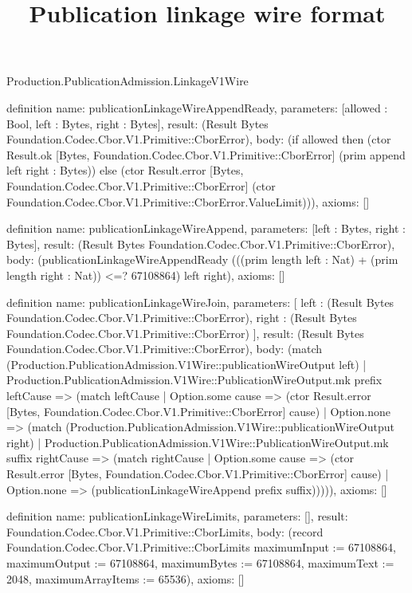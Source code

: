 \begin{lexlean}{Production.PublicationAdmission.LinkageV1Wire}
\title{Publication linkage wire format}
\begin{semanticmodule}
definition{
  name: publicationLinkageWireAppendReady,
  parameters: [allowed : Bool, left : Bytes, right : Bytes],
  result: (Result Bytes Foundation.Codec.Cbor.V1.Primitive::CborError),
  body: (if allowed then (ctor Result.ok [Bytes, Foundation.Codec.Cbor.V1.Primitive::CborError] (prim append left right : Bytes)) else (ctor Result.error [Bytes, Foundation.Codec.Cbor.V1.Primitive::CborError] (ctor Foundation.Codec.Cbor.V1.Primitive::CborError.ValueLimit))),
  axioms: []
}

definition{
  name: publicationLinkageWireAppend,
  parameters: [left : Bytes, right : Bytes],
  result: (Result Bytes Foundation.Codec.Cbor.V1.Primitive::CborError),
  body: (publicationLinkageWireAppendReady (((prim length left : Nat) + (prim length right : Nat)) <=? 67108864) left right),
  axioms: []
}

definition{
  name: publicationLinkageWireJoin,
  parameters: [
    left : (Result Bytes Foundation.Codec.Cbor.V1.Primitive::CborError),
    right : (Result Bytes Foundation.Codec.Cbor.V1.Primitive::CborError)
  ],
  result: (Result Bytes Foundation.Codec.Cbor.V1.Primitive::CborError),
  body: (match (Production.PublicationAdmission.V1Wire::publicationWireOutput left)
    | Production.PublicationAdmission.V1Wire::PublicationWireOutput.mk prefix leftCause => (match leftCause
      | Option.some cause => (ctor Result.error [Bytes, Foundation.Codec.Cbor.V1.Primitive::CborError] cause)
      | Option.none => (match (Production.PublicationAdmission.V1Wire::publicationWireOutput right)
        | Production.PublicationAdmission.V1Wire::PublicationWireOutput.mk suffix rightCause => (match rightCause
          | Option.some cause => (ctor Result.error [Bytes, Foundation.Codec.Cbor.V1.Primitive::CborError] cause)
          | Option.none => (publicationLinkageWireAppend prefix suffix))))),
  axioms: []
}

definition{
  name: publicationLinkageWireLimits,
  parameters: [],
  result: Foundation.Codec.Cbor.V1.Primitive::CborLimits,
  body: (record Foundation.Codec.Cbor.V1.Primitive::CborLimits {maximumInput := 67108864, maximumOutput := 67108864, maximumBytes := 67108864, maximumText := 2048, maximumArrayItems := 65536}),
  axioms: []
}


\end{semanticmodule}
\end{lexlean}

